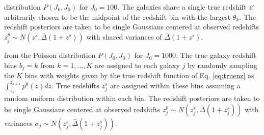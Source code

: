\documentclass[preprint]{aastex}
\begin{document}

distribution $P(J_{0},J_{0})$ for $J_{0}=100$.  The galaxies share a single 
true redshift $z^{s}$ arbitrarily chosen to be the midpoint of the redshift bin 
with the largest $\theta_{k}$.  The redshift posteriors are taken to be single 
Gaussians centered at observed redshifts $z^{p}_{j}\sim 
N(z^{s},\bar{\Delta}(1+z^{s}))$ with shared variances of 
$\bar{\Delta}(1+z^{s})$. 


from the Poisson distribution $P(J_{0},J_{0})$ for $J_{0}=1000$.  The true 
galaxy redshift bins $b_{j}=k$ from $k=1,\dots,K$ are assigned to each galaxy 
$j$ by randomly sampling the $K$ bins with weights given by the true redshift 
function of Eq. \ref{eq:truenz} as $\int_{z_{k}}^{z_{k+1}}p^{0}(z)dz$. True 
redshifts $z^{s}_{j}$ are assigned within these bins assuming a random uniform 
distribution within each bin.  The redshift posteriors are taken to be single 
Gaussians centered at observed redshifts $z^{p}_{j}\sim 
N(z^{s}_{j},\bar{\Delta}(1+z^{s}_{j}))$ with variances $\sigma_{j}\sim 
N(z^{s}_{j},\bar{\Delta}(1+z^{s}_{j}))$. 



\end{document}
